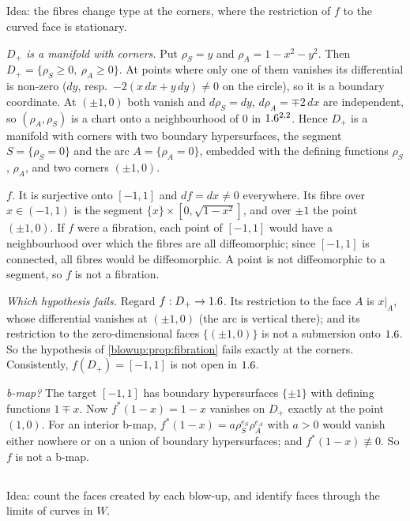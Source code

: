 \subsection*{}
Idea: the fibres change type at the corners, where the restriction of $f$ to the curved face
is stationary.

\emph{$D_+$ is a manifold with corners.} Put $\rho_S=y$ and $\rho_A=1-x^2-y^2$. Then
$D_+=\{\rho_S\ge0,\ \rho_A\ge0\}$. At points where only one of them vanishes its differential is
non-zero ($dy$, resp.\ $-2(x\,dx+y\,dy)\ne0$ on the circle), so it is a boundary coordinate. At
$(\pm1,0)$ both vanish and $d\rho_S=dy$, $d\rho_A=\mp2\,dx$ are independent, so $(\rho_A,\rho_S)$ is a
chart onto a neighbourhood of $0$ in $1.6^{2,2}$. Hence $D_+$ is a manifold with corners with two
boundary hypersurfaces, the segment $S=\{\rho_S=0\}$ and the arc $A=\{\rho_A=0\}$, embedded with
the defining functions $\rho_S$, $\rho_A$, and two corners $(\pm1,0)$.

\emph{$f$.} It is surjective onto $[-1,1]$ and $df=dx\ne0$ everywhere. Its fibre over
$x\in(-1,1)$ is the segment $\{x\}\times[0,\sqrt{1-x^2}]$, and over $\pm1$ the point $(\pm1,0)$.
If $f$ were a fibration, each point of $[-1,1]$ would have a neighbourhood over which the fibres
are all diffeomorphic; since $[-1,1]$ is connected, all fibres would be diffeomorphic. A point
is not diffeomorphic to a segment, so $f$ is not a fibration.

\emph{Which hypothesis fails.} Regard $f:D_+\to1.6$. Its restriction to the face $A$ is
$x|_A$, whose differential vanishes at $(\pm1,0)$ (the arc is vertical there); and its restriction
to the zero-dimensional faces $\{(\pm1,0)\}$ is not a submersion onto $1.6$. So the hypothesis of
\cref{blowup:prop:fibration} fails exactly at the corners. Consistently, $f(D_+)=[-1,1]$ is not
open in $1.6$.

\emph{b-map?} The target $[-1,1]$ has boundary hypersurfaces $\{\pm1\}$ with defining functions
$1\mp x$. Now $f^*(1-x)=1-x$ vanishes on $D_+$ exactly at the point $(1,0)$. For an interior
b-map, $f^*(1-x)=a\rho_S^{e_S}\rho_A^{e_A}$ with $a>0$ would vanish either nowhere or on a union of
boundary hypersurfaces; and $f^*(1-x)\not\equiv0$. So $f$ is not a b-map.

\subsection*{}
Idea: count the faces created by each blow-up, and identify faces through the limits of curves
in $W$.

